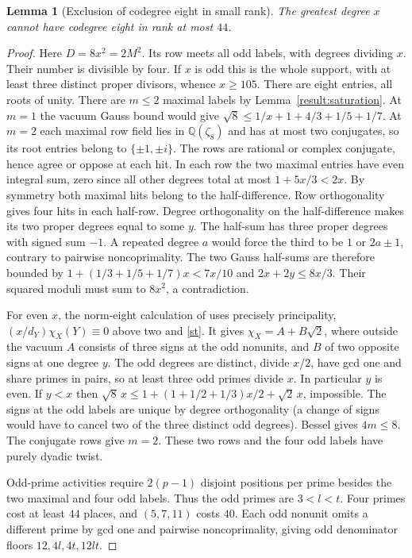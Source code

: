 \documentclass[11pt]{amsart}
\numberwithin{equation}{section}
\newtheorem{lemma}[theorem]{Lemma}
\theoremstyle{definition}
\theoremstyle{plain}
\newcommand{\QQ}{\mathbb Q}
\begin{document}
\begin{lemma}[Exclusion of codegree eight in small rank]
The greatest degree $x$ cannot have codegree eight in rank at most $44$.
\end{lemma}
\begin{proof}
Here $D=8x^2=2M^2$. Its row meets all odd labels, with degrees dividing
$x$. Their number is divisible by four. If $x$ is odd this is the
whole support, with at least three distinct proper divisors, whence
$x\ge105$. There are eight entries, all roots of unity. There are
$m\le2$ maximal labels by Lemma~\ref{result:saturation}. At $m=1$ the
vacuum Gauss bound would give $\sqrt8\le1/x+1+4/3+1/5+1/7$.
At $m=2$ each maximal row field lies in $\QQ(\zeta_8)$ and has
at most two conjugates, so its root entries belong to $\{\pm1,\pm i\}$.
The rows are rational or complex conjugate, hence agree or oppose at
each hit. In each row the two maximal entries have even integral sum,
zero since all other degrees total at most $1+5x/3<2x$.
By symmetry both maximal hits belong to the half-difference.
Row orthogonality gives four hits in each half-row. Degree orthogonality
on the half-difference makes its two proper degrees equal to some $y$.
The half-sum has three proper degrees with signed sum $-1$. A repeated
degree $a$ would force the third to be $1$ or $2a\pm1$, contrary to
pairwise noncoprimality. The two Gauss half-sums are therefore bounded
by $1+(1/3+1/5+1/7)x<7x/10$ and $2x+2y\le8x/3$. Their squared
moduli must sum to $8x^2$, a contradiction.

For even $x$, the norm-eight calculation of
\cite[proof of Theorem~20.7]{BDPcore} uses precisely principality,
$(x/d_Y)\chi_X(Y)\equiv0$ above two and \eqref{st}. It gives
$\chi_X=A+B\sqrt2$, where outside the vacuum $A$ consists of
three signs at the odd nonunits, and $B$ of two opposite signs at
one degree $y$. The odd degrees are distinct, divide $x/2$, have
gcd one and share primes in pairs, so at least three odd primes
divide $x$. In particular $y$ is even. If $y<x$ then
$\sqrt8\,x\le1+(1+1/2+1/3)x/2+\sqrt2\,x$, impossible.
The signs at the odd labels are unique by degree orthogonality
(a change of signs would have to cancel two of the three distinct
odd degrees). Bessel gives $4m\le8$. The conjugate rows give
$m=2$. These two rows and the four odd labels have purely dyadic twist.

Odd-prime activities require $2(p-1)$ disjoint positions per prime
besides the two maximal and four odd labels. Thus the odd primes are $3<l<t$.
Four primes cost at least $44$ places, and $(5,7,11)$ costs $40$.
Each odd nonunit omits a different prime by gcd one and pairwise
noncoprimality, giving odd denominator floors $12,4l,4t,12lt$.


\end{proof}
\end{document}
